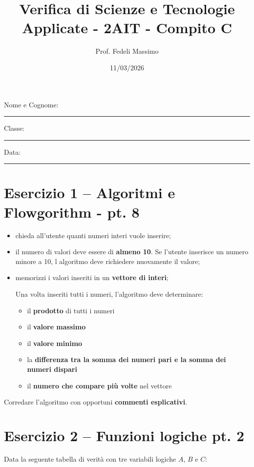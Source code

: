 \documentclass[a4paper,12pt]{article}
\title{Verifica di Scienze e Tecnologie Applicate  - 2AIT - Compito C}
\author{Prof. Fedeli Massimo}
\date{11/03/2026}
\begin{document}
	
	\maketitle
	
	Nome e Cognome: \rule{8cm}{0.4pt}
	
	Classe: \rule{3cm}{0.4pt} \hfill Data: \rule{3cm}{0.4pt}
	
	\vspace{1cm}
	
	\section*{Esercizio 1 – Algoritmi e Flowgorithm - pt. 8}
	
		\begin{itemize}
	\item chieda all'utente quanti numeri interi vuole inserire;
	\item il numero di valori deve essere di \textbf{almeno 10}. Se l'utente inserisce un numero minore a 10, l algoritmo deve richiedere nuovamente il valore;
	\item memorizzi i valori inseriti in un \textbf{vettore di interi};
	
	Una volta inseriti tutti i numeri, l'algoritmo deve determinare:
	
	\begin{itemize}
		\item il \textbf{prodotto} di tutti i numeri
		\item il \textbf{valore massimo}
		\item il \textbf{valore minimo}
		\item la \textbf{differenza tra la somma dei numeri pari e la somma dei numeri dispari}
		\item il \textbf{numero che compare più volte} nel vettore
	\end{itemize}
		\end{itemize}
	Corredare l'algoritmo con opportuni \textbf{commenti esplicativi}.
	
	\vspace{1cm}
	
	\section*{Esercizio 2 – Funzioni logiche pt. 2}
	
	Data la seguente tabella di verità con tre variabili logiche \(A\), \(B\) e \(C\):
	
\end{document}
